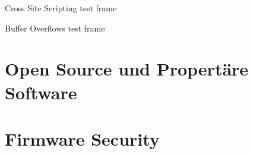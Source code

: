 \documentclass[10pt]{beamer}
\begin{document}
\begin{frame}[fragile]{Cross Site Scripting}
  test frame
\end{frame}

\begin{frame}[fragile]{Buffer Overflows}
  test frame
\end{frame}


\section{Open Source und Propert\"are Software}


\section{Firmware Security}
\end{document}
